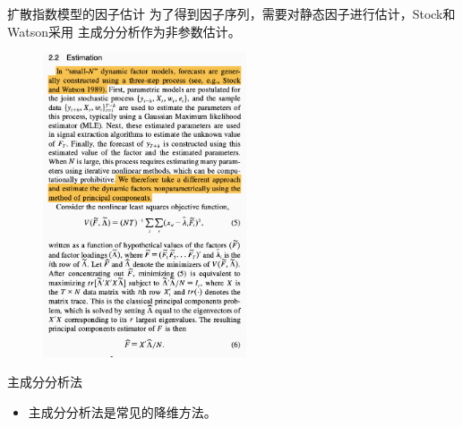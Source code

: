 \begin{frame}{扩散指数模型的因子估计}
    为了得到因子序列，需要对静态因子进行估计，Stock和Watson采用
    主成分分析作为非参数估计。
    \begin{figure}[H]
        \includegraphics[width=6cm]{pics/stock-principle.png}
        \end{figure}
\end{frame}

\begin{frame}{主成分分析法}
    \begin{itemize}
        \item
        主成分分析法是常见的降维方法。
    \end{itemize}
\end{frame}